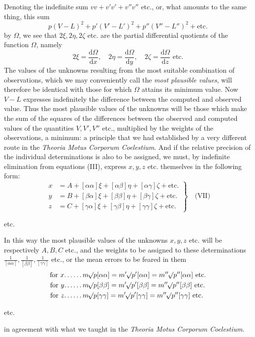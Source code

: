 Denoting the indefinite sum \(vv+v'v'+v''v''\text{ etc.}\), or, what amounts to the same thing, this sum
\[
p(V-L)^2+p'(V'-L')^2+p''(V''-L'')^2+\text{etc.}
\]
by \(\Omega\), we see that \(2\xi,2\eta,2\zeta\) etc. are the partial differential quotients of the function \(\Omega\), namely
\[
2\xi=\frac{\mathrm{d}\Omega}{\mathrm{d}x},\quad2\eta=\frac{\mathrm{d}\Omega}{\mathrm{d}y},\quad2\zeta=\frac{\mathrm{d}\Omega}{\mathrm{d}z}\text{ etc.}
\]
The values of the unknowns resulting from the most suitable combination of observations, which we may conveniently call the \textit{most plausible values}, will therefore be identical with those for which \(\Omega\) attains its minimum value. Now \(V-L\) expresses indefinitely the difference between the computed and observed value. Thus the most plausible values of the unknowns will be those which make the sum of the squares of the differences between the observed and computed values of the quantities \(V,V',V''\) etc., multiplied by the weights of the observations, a minimum: a principle that we had established by a very different route in the \textit{Theoria Motus Corporum Coelestium}. And if the relative precision of the individual determinations is also to be assigned, we must, by indefinite elimination from equations (III), express \(x,y,z\) etc. themselves in the following form:
\[
\left.\begin{aligned}
x&=A+[\alpha\alpha]\xi+[\alpha\beta]\eta+[\alpha\gamma]\zeta+\text{etc.}\\
y&=B+[\beta\alpha]\xi+[\beta\beta]\eta+[\beta\gamma]\zeta+\text{etc.}\\
z&=C+[\gamma\alpha]\xi+[\gamma\beta]\eta+[\gamma\gamma]\zeta+\text{etc.}
\end{aligned}\right\}\quad\text{(VII)}
\]
\begin{center}etc.\end{center}
In this way the most plausible values of the unknowns \(x,y,z\) etc. will be respectively \(A,B,C\) etc., and the weights to be assigned to these determinations \(\frac1{[\alpha\alpha]},\frac1{[\beta\beta]},\frac1{[\gamma\gamma]}\) etc., or the mean errors to be feared in them
\[
\begin{aligned}
\text{for }x\mathord{.}\,\mathord{.}\,\mathord{.}\,\mathord{.}\,\mathord{.}\,\mathord{.}\,&m\BareRoot{p[\alpha\alpha]}=m'\BareRoot{p'[\alpha\alpha]}=m''\BareRoot{p''[\alpha\alpha]}\text{ etc.}\\
\text{for }y\mathord{.}\,\mathord{.}\,\mathord{.}\,\mathord{.}\,\mathord{.}\,\mathord{.}\,&m\BareRoot{p[\beta\beta]}=m'\BareRoot{p'[\beta\beta]}=m''\BareRoot{p''[\beta\beta]}\text{ etc.}\\
\text{for }z\mathord{.}\,\mathord{.}\,\mathord{.}\,\mathord{.}\,\mathord{.}\,\mathord{.}\,&m\BareRoot{p[\gamma\gamma]}=m'\BareRoot{p'[\gamma\gamma]}=m''\BareRoot{p''[\gamma\gamma]}\text{ etc.}
\end{aligned}
\]
\begin{center}etc.\end{center}
in agreement with what we taught in the \textit{Theoria Motus Corporum Coelestium}.

